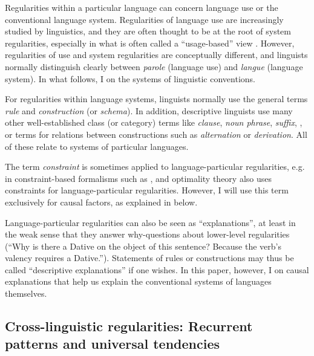 \documentclass[output=paper]{langsci/langscibook}
\begin{document}
Regularities within a particular language can concern language use or the conventional language system. Regularities of language use are increasingly studied by  linguistics, and they are often thought to be at the root of system regularities, especially in what is often called a “usage-based” view \citep{Bybee2010}. However, regularities of use and system regularities are conceptually different, and linguists normally distinguish clearly between \textit{parole} (language use) and \textit{langue} (language system). In what follows, I  on the systems of linguistic conventions.

For regularities within language systems, linguists normally use the general terms \textit{rule} and \textit{construction} (or \textit{schema}). In addition, descriptive linguists use many other well-established class (or category) terms like \textit{clause}, \textit{noun phrase}, \textit{suffix}, \textit{ }, or terms for relations between constructions such as \textit{alternation} or \textit{derivation}. All of these relate to systems of particular languages.

The term \textit{constraint} is sometimes applied to language-particular regularities, e.g. in constraint-based formalisms such as , and optimality theory also uses constraints for language-particular regularities. However, I will use this term exclusively for causal factors, as explained in  below.

Language-particular regularities can also be seen as “explanations”, at least in the weak sense that they answer why-questions about lower-level regularities (“Why is there a Dative  on the object of this sentence? Because the verb’s valency requires a Dative.”). Statements of rules or constructions may thus be called “descriptive explanations” if one wishes. In this paper, however, I  on causal explanations that help us explain the conventional systems of languages themselves.

\subsection{Cross-linguistic regularities: Recurrent patterns and universal tendencies}\label{sec:haspelmath:2.2}
\end{document}
